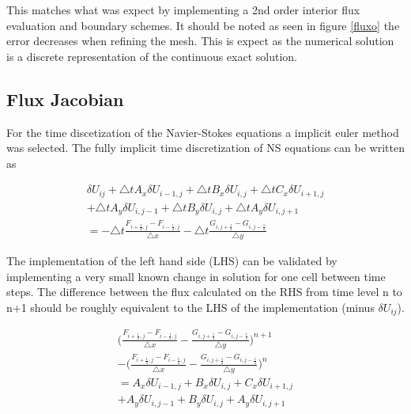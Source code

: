 \documentclass[paper=a4, fontsize=11pt, abstract=on]{scrartcl}
\numberwithin{equation}{section}		%
\numberwithin{figure}{section}			%
\numberwithin{table}{section}				%
\begin{document}
This matches what was expect by implementing a 2nd order interior flux evaluation and boundary schemes. It should be noted as seen in figure \ref{fluxo} the error decreases when refining the mesh. This is expect as the numerical solution is a discrete representation of the continuous exact solution. 

 
\subsection{Flux Jacobian}
For the time discetization of the Navier-Stokes equations a implicit euler method was selected. The fully implicit time discretization of NS equations can be written as 


 \begin{equation}
  \begin{aligned}
\delta U_{ij} + \triangle t A_x \delta U_{i-1,j} + \triangle t B_x \delta U_{i,j} + \triangle t C_x \delta U_{i+1,j}\\
  +\triangle t A_y \delta U_{i,j-1} + \triangle t B_y \delta U_{i,j} + \triangle t A_y \delta U_{i,j+1} \\
  = -\triangle t \frac{F_{i+\frac{1}{2},j}-F_{i-\frac{1}{2},j}}{\triangle x} -\triangle t \frac{G_{i, j+\frac{1}{2}}-G_{i,j-\frac{1}{2}}}{\triangle y}
 \end{aligned}
\end{equation}

The implementation of the left hand side (LHS) can be validated by implementing a very small known change in solution for one cell between time steps. The difference between the flux calculated on the RHS from time level n to n+1 should be roughly equivalent to the LHS of the implementation (minus $\delta U_{ij}$). 



 \begin{equation}
  \begin{aligned}
 \Bigg( \frac{F_{i+\frac{1}{2},j}-F_{i-\frac{1}{2},j}}{\triangle x} - \frac{G_{i, j+\frac{1}{2}}-G_{i,j-\frac{1}{2}}}{\triangle y}\Bigg)^{n+1}
  \\ -\Bigg( \frac{F_{i+\frac{1}{2},j}-F_{i-\frac{1}{2},j}}{\triangle x} - \frac{G_{i, j+\frac{1}{2}}-G_{i,j-\frac{1}{2}}}{\triangle y}\Bigg)^{n} \\
   = A_x \delta U_{i-1,j} +  B_x \delta U_{i,j} +  C_x \delta U_{i+1,j}\\
  + A_y \delta U_{i,j-1} +  B_y \delta U_{i,j} +  A_y \delta U_{i,j+1}
 \end{aligned}
\end{equation}
\end{document}
